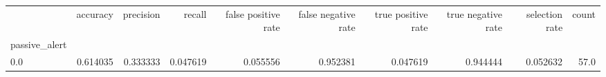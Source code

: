 \begin{tabular}{lrrrrrrrrr}
\toprule
{} &  accuracy &  precision &    recall &  false positive rate &  false negative rate &  true positive rate &  true negative rate &  selection rate &  count \\
passive\_alert &           &            &           &                      &                      &                     &                     &                 &        \\
\midrule
0.0           &  0.614035 &   0.333333 &  0.047619 &             0.055556 &             0.952381 &            0.047619 &            0.944444 &        0.052632 &   57.0 \\
\bottomrule
\end{tabular}
